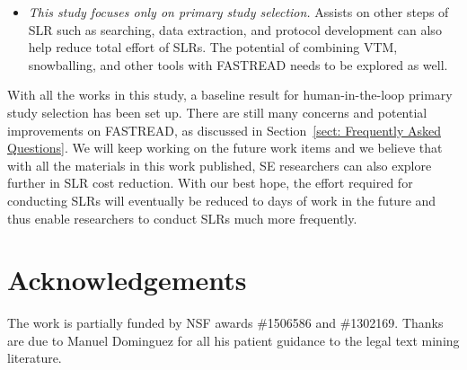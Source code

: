 \documentclass[final,twocolumn,5p]{elsarticle}
\theoremstyle{break}
\begin{document}
\begin{itemize}
\item
{\em This study focuses only on primary study selection.} Assists on other steps of SLR such as searching, data extraction, and protocol development can also help reduce total effort of SLRs. The potential of combining VTM, snowballing, and other tools with FASTREAD needs to be explored as well.


\end{itemize}

With all the works in this study, a baseline result for human-in-the-loop primary study selection has been set up. There are still many concerns and potential improvements on FASTREAD, as discussed in Section~\ref{sect: Frequently Asked Questions}. We will keep working on the future work items and we believe that with all the materials in this work published, SE researchers can also explore further in SLR cost reduction. With our best hope, the effort required for conducting SLRs will eventually be reduced to days of work in the future and thus enable researchers to conduct SLRs much more frequently.

	\section*{Acknowledgements}
		The work is partially funded by NSF  awards \#1506586 and \#1302169. Thanks are due to Manuel Dominguez for all his
		patient guidance to the legal text mining literature.

 
\vspace*{0.5mm}
 
 
% 

 
% 
\balance




\end{document}
